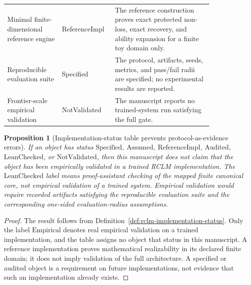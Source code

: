 \documentclass[11pt,a4paper]{article}
\newtheorem{proposition}[theorem]{Proposition}
\begin{document}
\begin{longtable}{p{0.24\linewidth}p{0.17\linewidth}p{0.43\linewidth}}
Minimal finite-dimensional reference engine & ReferenceImpl & The reference construction proves exact protected non-loss, exact recovery, and ability expansion for a finite toy domain only.\\
Reproducible evaluation suite & Specified & The protocol, artifacts, seeds, metrics, and pass/fail radii are specified; no experimental results are reported.\\
Frontier-scale empirical validation & NotValidated & The manuscript reports no trained-system run satisfying the full gate.\\
\end{longtable}

\begin{proposition}[Implementation-status table prevents protocol-as-evidence errors]
\label{prop:implementation-status-discipline}
If an object has status \(\mathrm{Specified}\), \(\mathrm{Assumed}\), \(\mathrm{ReferenceImpl}\), \(\mathrm{Audited}\), \(\mathrm{LeanChecked}\), or \(\mathrm{NotValidated}\), then this manuscript does not claim that the object has been empirically validated in a trained RCLM implementation. The \(\mathrm{LeanChecked}\) label means proof-assistant checking of the mapped finite canonical core, not empirical validation of a trained system. Empirical validation would require recorded artifacts satisfying the reproducible evaluation suite and the corresponding one-sided evaluation-radius assumptions.
\end{proposition}

\begin{proof}
The result follows from Definition~\ref{def:rclm-implementation-status}. Only the label \(\mathrm{Empirical}\) denotes real empirical validation on a trained implementation, and the table assigns no object that status in this manuscript. A reference implementation proves mathematical realizability in its declared finite domain; it does not imply validation of the full architecture. A specified or audited object is a requirement on future implementations, not evidence that such an implementation already exists.
\end{proof}
\end{document}
